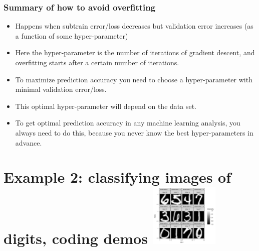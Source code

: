 \documentclass{beamer}
\begin{document}
\begin{frame}
  \frametitle{Summary of how to avoid overfitting}
  \begin{itemize}
  \item Happens when subtrain error/loss decreases but validation error
    increases (as a function of some hyper-parameter)
  \item Here the hyper-parameter is the number of iterations of
    gradient descent, and overfitting starts after a certain number of
    iterations.
  \item To maximize prediction accuracy you need to choose a
    hyper-parameter with minimal validation error/loss.
  \item This optimal hyper-parameter will depend on the data set.
  \item To get optimal prediction accuracy in any machine learning
    analysis, you always need to do this, because you never know the
    best hyper-parameters in advance.
  \end{itemize}
\end{frame}

\section{Example 2: classifying images of digits, coding demos  
\includegraphics[height=3cm]{figure-validation-loss-digits}}
\end{document}
